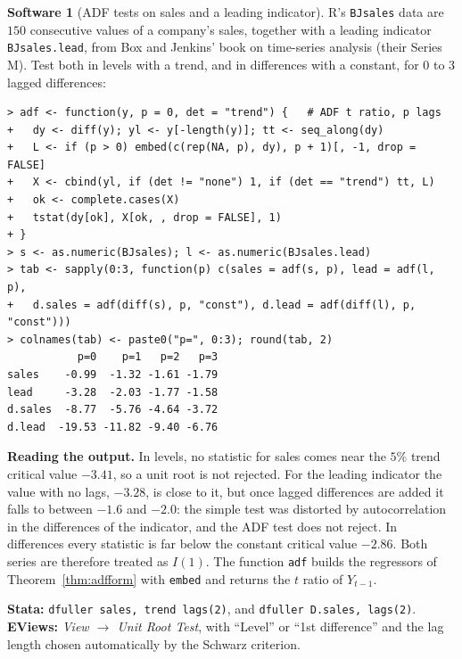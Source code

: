 \documentclass[11pt,a4paper]{article}
\numberwithin{equation}{section}
\theoremstyle{definition}
\newtheorem{software}[thm]{Software}
\begin{document}
\begin{software}[ADF tests on sales and a leading indicator]
\label{sw:adf}
R's \texttt{BJsales} data are $150$ consecutive values of a company's sales, together with a leading indicator \texttt{BJsales.lead}, from Box and
Jenkins' book on time-series analysis (their Series M). Test both in levels with a trend, and in differences with a constant, for $0$ to $3$ lagged
differences:
{\small\begin{verbatim}
> adf <- function(y, p = 0, det = "trend") {   # ADF t ratio, p lags
+   dy <- diff(y); yl <- y[-length(y)]; tt <- seq_along(dy)
+   L <- if (p > 0) embed(c(rep(NA, p), dy), p + 1)[, -1, drop = FALSE]
+   X <- cbind(yl, if (det != "none") 1, if (det == "trend") tt, L)
+   ok <- complete.cases(X)
+   tstat(dy[ok], X[ok, , drop = FALSE], 1)
+ }
> s <- as.numeric(BJsales); l <- as.numeric(BJsales.lead)
> tab <- sapply(0:3, function(p) c(sales = adf(s, p), lead = adf(l, p),
+   d.sales = adf(diff(s), p, "const"), d.lead = adf(diff(l), p, "const")))
> colnames(tab) <- paste0("p=", 0:3); round(tab, 2)
           p=0    p=1   p=2   p=3
sales    -0.99  -1.32 -1.61 -1.79
lead     -3.28  -2.03 -1.77 -1.58
d.sales  -8.77  -5.76 -4.64 -3.72
d.lead  -19.53 -11.82 -9.40 -6.76
\end{verbatim}}
\textbf{Reading the output.} In levels, no statistic for sales comes near the $5\%$ trend critical value $-3.41$, so a unit root is not rejected. For the leading
indicator the value with no lags, $-3.28$, is close to it, but once lagged differences are added it falls to between $-1.6$ and $-2.0$: the simple
test was distorted by autocorrelation in the differences of the indicator, and the ADF test does not reject. In differences every statistic is far below the constant critical value
$-2.86$. Both series are therefore treated as $I(1)$. The function \texttt{adf} builds the regressors of Theorem~\ref{thm:adfform} with \texttt{embed} and returns the $t$
ratio of $Y_{t-1}$.

\textbf{Stata:} \texttt{dfuller sales, trend lags(2)}, and \texttt{dfuller D.sales, lags(2)}. \textbf{EViews:} \emph{View $\to$ Unit Root Test}, with ``Level'' or ``1st difference''
and the lag length chosen automatically by the Schwarz criterion.
\end{software}
\end{document}
